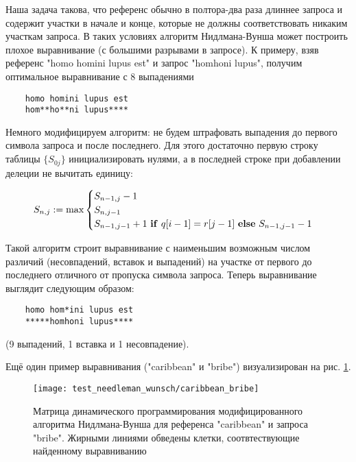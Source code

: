 \documentclass{main.tex}[subfiles]
\begin{document}
Наша задача такова, что референс обычно в полтора-два раза длиннее запроса и содержит участки в начале и конце, которые не должны соответствовать никаким участкам запроса.
В таких условиях алгоритм Нидлмана-Вунша может построить плохое выравнивание (с большими разрывами в запросе).
К примеру, взяв референс "homo homini lupus est"\hspace{0pt} и запрос "homhoni lupus"\hspace{0pt}, получим оптимальное выравнивание с 8 выпадениями

\begin{verbatim}
    homo homini lupus est
    hom**ho**ni lupus****
\end{verbatim}

Немного модифицируем алгоритм: не будем штрафовать выпадения до первого символа запроса и после последнего.
Для этого достаточно первую строку таблицы $ \{ S_{0j} \} $ инициализировать нулями, а в последней строке при добавлении делеции не вычитать единицу:

\[ S_{n,j} := \max \begin{cases}
    S_{n-1,j} - 1 \\
    S_{n,j-1} \\
    S_{n-1,j-1} + 1 \text{ \textbf{if} } q[i-1] = r[j-1] \text{ \textbf{else} } S_{n-1,j-1} - 1
\end{cases} \]

Такой алгоритм строит выравнивание с наименьшим возможным числом различий (несовпадений, вставок и выпадений) на участке от первого до последнего отличного от пропуска символа запроса. %
Теперь выравнивание выглядит следующим образом:

\begin{verbatim}
    homo hom*ini lupus est
    *****homhoni lupus****
\end{verbatim}

(9 выпадений, 1 вставка и 1 несовпадение).

Ещё один пример выравнивания ("caribbean"\hspace{0pt} и "bribe") визуализирован на рис. \ref{fig:caribbean_bribe}.

\begin{figure}[H]
    \centering
    \texttt{[image: test\_needleman\_wunsch/caribbean\_bribe]}
    \caption{Матрица динамического программирования модифицированного алгоритма Нидлмана-Вунша для референса "caribbean"\hspace{0pt} и запроса "bribe". Жирными линиями обведены клетки, соотвтествующие найденному выравниванию }
    \label{fig:caribbean_bribe}
\end{figure}
\end{document}
